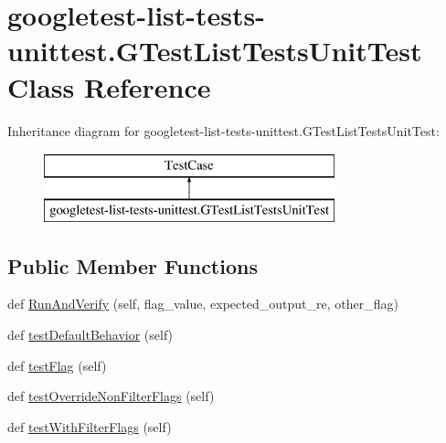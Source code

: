 \hypertarget{classgoogletest-list-tests-unittest_1_1_g_test_list_tests_unit_test}{}\section{googletest-\/list-\/tests-\/unittest.G\+Test\+List\+Tests\+Unit\+Test Class Reference}
\label{classgoogletest-list-tests-unittest_1_1_g_test_list_tests_unit_test}
Inheritance diagram for googletest-\/list-\/tests-\/unittest.G\+Test\+List\+Tests\+Unit\+Test\+:\begin{figure}[H]
\begin{center}
\leavevmode
\includegraphics[height=2.000000cm]{d0/d14/classgoogletest-list-tests-unittest_1_1_g_test_list_tests_unit_test}
\end{center}
\end{figure}
\subsection*{Public Member Functions}
\begin{DoxyCompactItemize}
\item 
def \mbox{\hyperlink{classgoogletest-list-tests-unittest_1_1_g_test_list_tests_unit_test_a6630e10404717e8edd3df1439fb0d81c}{Run\+And\+Verify}} (self, flag\+\_\+value, expected\+\_\+output\+\_\+re, other\+\_\+flag)
\item 
def \mbox{\hyperlink{classgoogletest-list-tests-unittest_1_1_g_test_list_tests_unit_test_aacba8c9eaef1b649ba40ede17218d0f1}{test\+Default\+Behavior}} (self)
\item 
def \mbox{\hyperlink{classgoogletest-list-tests-unittest_1_1_g_test_list_tests_unit_test_a8f5b423963d862456348a8903ccdfade}{test\+Flag}} (self)
\item 
def \mbox{\hyperlink{classgoogletest-list-tests-unittest_1_1_g_test_list_tests_unit_test_a961396c3c2b8d22f6491beb5348594aa}{test\+Override\+Non\+Filter\+Flags}} (self)
\item 
def \mbox{\hyperlink{classgoogletest-list-tests-unittest_1_1_g_test_list_tests_unit_test_adb60d2295fee8ed4af2a5ee1a32e5778}{test\+With\+Filter\+Flags}} (self)
\end{DoxyCompactItemize}


